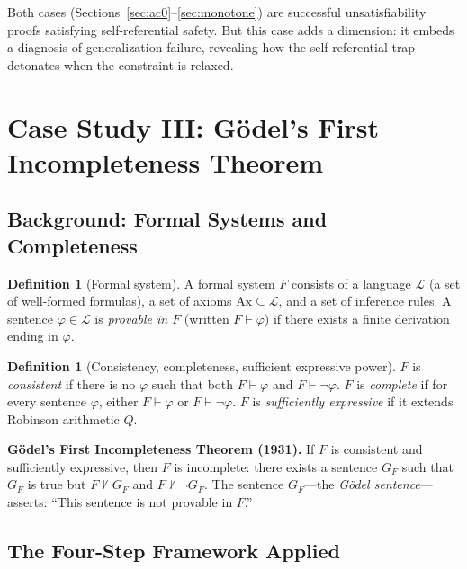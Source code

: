 \documentclass[11pt,a4paper]{article}
\theoremstyle{plain}
\theoremstyle{definition}
\newtheorem{definition}[theorem]{Definition}
\theoremstyle{remark}
\begin{document}
Both cases (Sections~\ref{sec:ac0}--\ref{sec:monotone}) are successful unsatisfiability proofs satisfying self-referential safety. But this case adds a dimension: it embeds a diagnosis of generalization failure, revealing how the self-referential trap detonates when the constraint is relaxed.

\section{Case Study III: G\"{o}del's First Incompleteness Theorem}
\label{sec:godel}

\subsection{Background: Formal Systems and Completeness}

\begin{definition}[Formal system]
A formal system $F$ consists of a language $\mathcal{L}$ (a set of well-formed formulas), a set of axioms $\mathrm{Ax} \subseteq \mathcal{L}$, and a set of inference rules. A sentence $\varphi \in \mathcal{L}$ is \emph{provable in $F$} (written $F \vdash \varphi$) if there exists a finite derivation ending in $\varphi$.
\end{definition}

\begin{definition}[Consistency, completeness, sufficient expressive power]
$F$ is \emph{consistent} if there is no $\varphi$ such that both $F \vdash \varphi$ and $F \vdash \neg\varphi$. $F$ is \emph{complete} if for every sentence $\varphi$, either $F \vdash \varphi$ or $F \vdash \neg\varphi$. $F$ is \emph{sufficiently expressive} if it extends Robinson arithmetic $Q$.
\end{definition}

\textbf{G\"{o}del's First Incompleteness Theorem (1931).} If $F$ is consistent and sufficiently expressive, then $F$ is incomplete: there exists a sentence $G_F$ such that $G_F$ is true but $F \nvdash G_F$ and $F \nvdash \neg G_F$. The sentence $G_F$---the \emph{G\"{o}del sentence}---asserts: ``This sentence is not provable in $F$.''

\subsection{The Four-Step Framework Applied}
\end{document}
